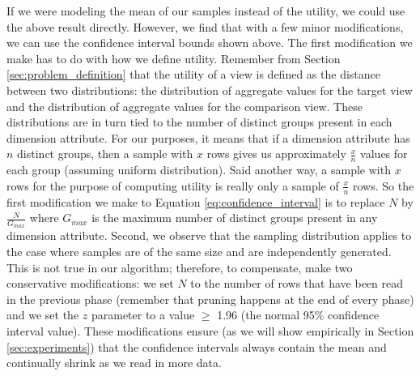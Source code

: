 If we were modeling the mean of our samples instead of the utility, we could use
the above result directly.
However, we find that with a few minor modifications, we can use the confidence
interval bounds shown above.
The first modification we make has to do with how we define utility.
Remember from Section \ref{sec:problem_definition} that the utility of a view is
defined as the distance between two distributions: the distribution of aggregate values for the
target view and the distribution of aggregate values for the comparison view.
These distributions are in turn tied to the number of distinct groups present in
each dimension attribute.
For our purposes, it means that if a dimension attribute has $n$ distinct
groups, then a sample with $x$ rows gives us approximately $\frac{x}{n}$ values
for each group (assuming uniform distribution).
Said another way, a sample with $x$ rows for the purpose of computing utility is
really only a sample of $\frac{x}{n}$ rows.
So the first modification we make to Equation \ref{eq:confidence_interval} is to
replace $N$ by $\frac{N}{G_{max}}$ where $G_{max}$ is the maximum number of
distinct groups present in any dimension attribute.
Second, we observe that the sampling distribution applies to the case where
samples are of the same size and are independently generated.
This is not true in our algorithm; therefore, to compensate, make two
conservative modifications: we set $N$ to the number of rows that
have been read in the previous phase (remember that pruning happens at the end
of every phase) and we set the $z$ parameter to a value $\geq$ 1.96 (the normal
95\% confidence interval value). These modifications ensure (as we will show
empirically in Section \ref{sec:experiments}) that the confidence intervals
always contain the mean and continually shrink as we read in more data.




